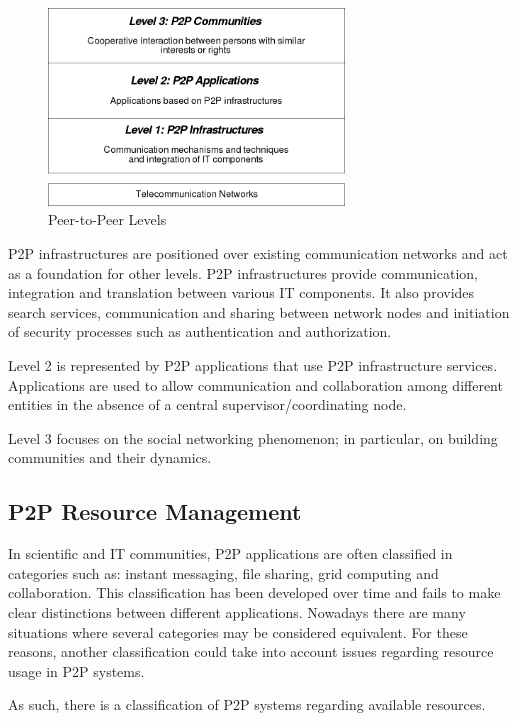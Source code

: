 \begin{figure}
  \centering
  \includegraphics[width=0.7\textwidth]{src/img/p2p-systems/p2p-levels}
  \caption{Peer-to-Peer Levels}
  \label{fig:p2p-systems:p2p-levels}
\end{figure}

P2P infrastructures are positioned over existing communication networks and
act as a foundation for other levels. P2P infrastructures provide
communication, integration and translation between various IT components. It
also provides search services, communication and sharing between network
nodes and initiation of security processes such as authentication and
authorization.

Level 2 is represented by P2P applications that use P2P infrastructure
services. Applications are used to allow communication and collaboration
among different entities in the absence of a central supervisor/coordinating
node.

Level 3 focuses on the social networking phenomenon; in particular, on
building communities and their dynamics.

\subsection{P2P Resource Management}

In scientific and IT communities, P2P applications are often classified in
categories such as: instant messaging, file sharing, grid computing and
collaboration.  This classification has been developed over time and fails to
make clear distinctions between different applications. Nowadays there are
many situations where several categories may be considered equivalent. For
these reasons, another classification could take into account issues regarding
resource usage in P2P systems.

As such, there is a classification of P2P systems regarding available
resources.


